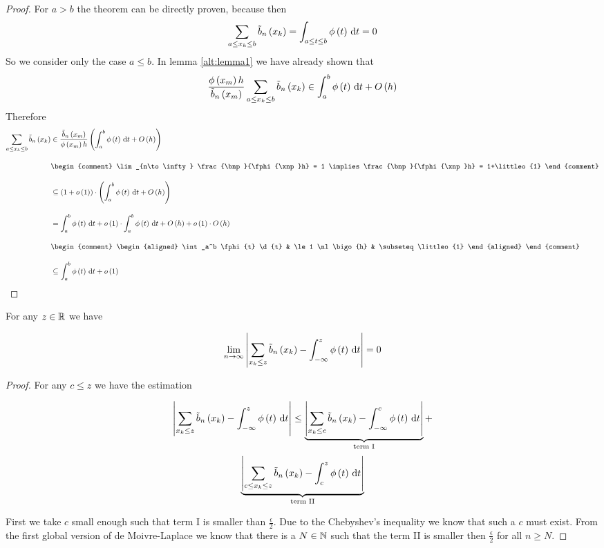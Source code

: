 \begin{proof}
  For $a > b$ the theorem can be directly proven, because then
  \begin{align}
    \sum_{a \le x_{k} \le b} \tilde b_{n}\left({x_{k}}\right) = \int_{a \le t \le b} \phi\left( {t} \right) \,\mathrm d{t} = 0
  \end{align}
  So we consider only the case $a\le b$. In lemma \ref{alt:lemma1} we have already shown that
  \begin{align}
    \frac{\phi\left( {x_{m}} \right)h}{\tilde b_{n}\left({x_{m}}\right)} \sum_{a\le x_{k} \le b} \tilde b_{n}\left({x_{k}}\right) \in \int_a^b \phi\left( {t} \right) \,\mathrm d{t} + O\left( {h} \right)
  \end{align}
  Therefore
  \begin{align}
    \sum_{a\le \x \le b} \bb{\x} & \in \frac{\bnp}{\fphi{\xnp}h} \br{\int_a^b \fphi{t} \d{t} + \bigo{h}} \bnl
    &
    \begin{comment}
      \lim_{n\to\infty} \frac{\bnp}{\fphi{\xnp}h} = 1 \implies \frac{\bnp}{\fphi{\xnp}h} = 1+\littleo{1}
    \end{comment} \bnl
    & \subseteq \br{1+\littleo{1}}\cdot \br{\int_a^b \fphi{t} \d{t} + \bigo{h}} \bnl
    & = \int_a^b \fphi{t}\d{t} + \littleo{1} \cdot \int_a^b \fphi{t} \d{t} + \bigo{h} + \littleo{1} \cdot \bigo{h} \bnl
    &
    \begin{comment}
      \begin{aligned}
        \int_a^b \fphi{t} \d{t} & \le 1 \nl
        \bigo{h} & \subseteq \littleo{1}
      \end{aligned}
    \end{comment} \bnl
    & \subseteq \int_a^b \fphi{t} \d{t} + \littleo{1}
  \end{align}
\end{proof}

\begin{theorem}
  For any $z\in\mathbb R$ we have

  \begin{align}
    \lim_{n\to\infty} \left|{\sum_{x_{k} \le z} \tilde b_{n}\left({x_{k}}\right) - \int_{-\infty}^z \phi\left( {t} \right)\,\mathrm d{t} }\right| = 0
  \end{align}
\end{theorem}

\begin{proof}
  For any $c \le z$ we have the estimation

  \begin{multline}
    \abs{\sum_{\x \le z} \bb{\x} - \int_{-\infty}^z \fphi{t}\d{t} } \le
    \underbrace{\abs{\sum_{\x \le c} \bb{\x} - \int_{-\infty}^c \fphi{t}\d{t} }}_\text{term I} + \nl \underbrace{\abs{\sum_{c\le \x \le z} \bb{\x} - \int_c^z \fphi{t}\d{t} }}_\text{term II}
  \end{multline}

  First we take $c$ small enough such that term I is smaller than $\frac \epsilon 2$. Due to the Chebyshev's inequality \cite{wiki:chebyshev} we know that such a $c$ must exist. From the first global version of de Moivre-Laplace we know that there is a $N \in\mathbb N$ such that the term II is smaller then $\frac \epsilon 2$ for all $n\ge N$.
\end{proof}

